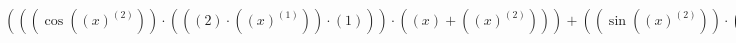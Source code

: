 \documentclass{article}
\begin{document}
$(((\cos{((x)^{(2)})})\cdot(((2)\cdot((x)^{(1)}))\cdot(1)))\cdot((x) + ((x)^{(2)}))) + ((\sin{((x)^{(2)})})\cdot((1) + (((2)\cdot((x)^{(1)}))\cdot(1))))$
\end{document}
